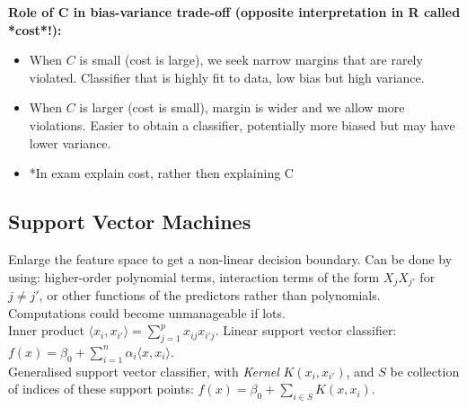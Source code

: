 \documentclass[11pt]{article}
\begin{document}
\noindent \textbf{Role of $\boldsymbol{C}$ in bias-variance trade-off (opposite interpretation in R called *cost*!):}
\begin{itemize}
    \item When $C$ is small (cost is large), we seek narrow margins that are rarely violated. Classifier that is highly fit to data, low bias but high variance.
    \item When $C$ is larger (cost is small), margin is wider and we allow more violations. Easier to obtain a classifier, potentially more biased but may have lower variance.
    \item *In exam explain cost, rather then explaining C
\end{itemize}

\subsection{Support Vector Machines}

Enlarge the feature space to get a non-linear decision boundary. Can be done by using: higher-order polynomial terms, interaction terms of the form $X_j X_{j'}$ for $j \neq j'$, or other functions of the predictors rather than polynomials. Computations could become unmanageable if lots. \\

\noindent Inner product $\langle x_i, x_{i'} \rangle = \sum_{j=1}^{p}x_{ij}x_{i'j}$. Linear support vector classifier: $f(x) = \beta_0 + \sum_{i=1}^{n}{\alpha_{i}\langle x, x_{i} \rangle}$. \\

\noindent Generalised support vector classifier, with \textit{Kernel} $K(x_i, x_{i'})$, and $S$ be collection of indices of these support points: $f(x) = \beta_0 + \sum_{i \in S}{K(x, x_{i})}$. \\
\end{document}
